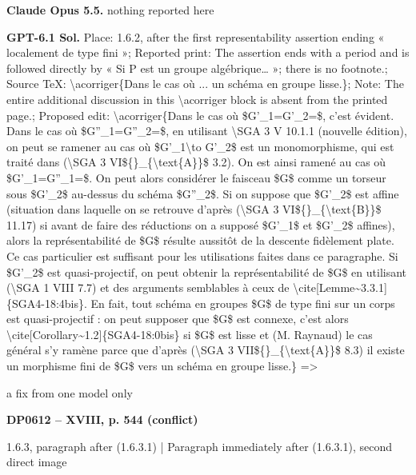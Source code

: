 \textbf{Claude Opus 5.5.} nothing reported here\par
\textbf{GPT-6.1 Sol.} Place: 1.6.2, after the first representability assertion ending « localement de type fini »; Reported print: The assertion ends with a period and is followed directly by « Si P est un groupe algébrique… »; there is no footnote.; Source TeX: \textbackslash{}acorriger\{Dans le cas où ... un schéma en groupe lisse.\}; Note: The entire additional discussion in this \textbackslash{}acorriger block is absent from the printed page.; Proposed edit: \textbackslash{}acorriger\{Dans le cas où \$G'\_1=\allowbreak G'\_2=\$, c'est évident. Dans le cas où \$G''\_1=\allowbreak G''\_2=\$, en utilisant \textbackslash{}SGA 3 V 10.1.1 (nouvelle édition), on peut se ramener au cas où \$G'\_1\textbackslash{}to G'\_2\$ est un monomorphisme, qui est traité dans (\textbackslash{}SGA 3 VI\$\{\}\_\{\textbackslash{}text\{A\}\}\$ 3.2). On est ainsi ramené au cas où \$G'\_1=\allowbreak G''\_1=\$. On peut alors considérer le faisceau \$G\$ comme un torseur sous \$G'\_2\$ au-dessus du schéma \$G''\_2\$. Si on suppose que \$G'\_2\$ est affine (situation dans laquelle on se retrouve d'après (\textbackslash{}SGA 3 VI\$\{\}\_\{\textbackslash{}text\{B\}\}\$ 11.17) si avant de faire des réductions on a supposé \$G'\_1\$ et \$G'\_2\$ affines), alors la représentabilité de \$G\$ résulte aussitôt de la descente fidèlement plate. Ce cas particulier est suffisant pour les utilisations faites dans ce paragraphe. Si \$G'\_2\$ est quasi-projectif, on peut obtenir la représentabilité de \$G\$ en utilisant (\textbackslash{}SGA 1 VIII 7.7) et des arguments semblables à ceux de \textbackslash{}cite[Lemme\textasciitilde{}3.3.1]\{SGA4-18:4bis\}. En fait, tout schéma en groupes \$G\$ de type fini sur un corps est quasi-projectif : on peut supposer que \$G\$ est connexe, c'est alors \textbackslash{}cite[Corollary\textasciitilde{}1.2]\{SGA4-18:0bis\} si \$G\$ est lisse et (M. Raynaud) le cas général s'y ramène parce que d'après (\textbackslash{}SGA 3 VII\$\{\}\_\{\textbackslash{}text\{A\}\}\$ 8.3) il existe un morphisme fini de \$G\$ vers un schéma en groupe lisse.\} =\allowbreak > \par
a fix from one model only\par
\par\noindent\hypertarget{DP0612}{}\textbf{DP0612 -- XVIII, p. 544 (conflict)}\par
1.6.3, paragraph after (1.6.3.1) | Paragraph immediately after (1.6.3.1), second direct image\par
